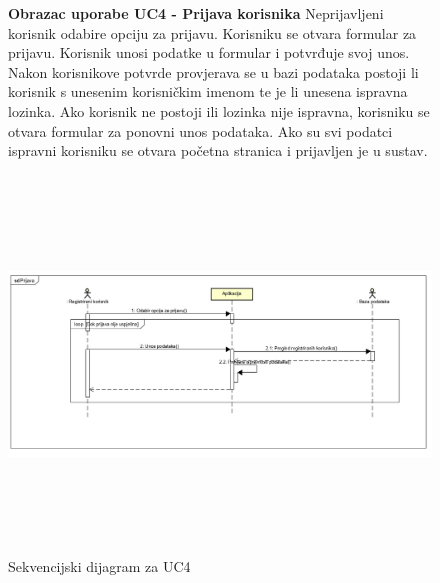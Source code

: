                 \begin{figure}[H]
                	\textbf{Obrazac uporabe UC4 - Prijava korisnika} 
                	\newline
                	\newline
                	Neprijavljeni korisnik odabire opciju za prijavu. Korisniku se otvara formular za prijavu. Korisnik unosi podatke u formular i potvrđuje svoj unos. Nakon korisnikove potvrde provjerava se u bazi podataka postoji li korisnik s unesenim korisničkim imenom te je li unesena ispravna lozinka. Ako korisnik ne postoji ili lozinka nije ispravna, korisniku se otvara formular za ponovni unos podataka. Ako su svi podatci ispravni korisniku se otvara početna stranica i prijavljen je u sustav. \par
                	\includegraphics[width=170mm,height=100mm]{slike/Prijava.png} 
                	\newline
					\centering
					\caption{Sekvencijski dijagram za UC4}
					\label{fig:promjene}
				\end{figure}
			
